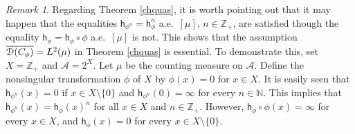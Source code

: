 \documentclass[draft,reqno]{amsproc}
\numberwithin{equation}{section}
\theoremstyle{remark}
\newtheorem{rem}[thm]{Remark}
\theoremstyle{definition}
\begin{document}
   \begin{rem}
Regarding Theorem \ref{chquas}, it is worth pointing
out that it may happen that the equalities
${\mathsf h}_{\phi^n} = {\mathsf h}_{\phi}^n$ a.e.\ $[\mu]$, $n\in
{\mathbb Z}_+$, are satisfied though the equality
${\mathsf h}_{\phi} = {\mathsf h}_{\phi} \circ \phi$ a.e.\ $[\mu]$
is not. This shows that the assumption
$\overline{{{\EuScript D}({C_{\phi}})}} = L^2(\mu)$ in Theorem
\ref{chquas} is essential. To demonstrate this, set
$X={\mathbb Z}_+$ and ${\mathscr A}=2^X$. Let $\mu$ be the counting
measure on ${\mathscr A}$. Define the nonsingular
transformation $\phi$ of $X$ by $\phi(x) = 0$ for
$x\in X$. It is easily seen that ${\mathsf h}_{\phi^n}(x) =
0$ if $x \in X \setminus \{0\}$ and ${\mathsf h}_{\phi^n}(0)
= \infty$ for every $n\in {\mathbb N}$. This implies that
${\mathsf h}_{\phi^n}(x) = {\mathsf h}_{\phi}(x)^n$ for all $x\in X$
and $n\in {\mathbb Z}_+$. However, ${\mathsf h}_{\phi} \circ \phi(x)
= \infty$ for every $x\in X$, and ${\mathsf h}_{\phi}(x) = 0$
for every $x \in X \setminus \{0\}$.
   \end{rem}
   
\end{document}
